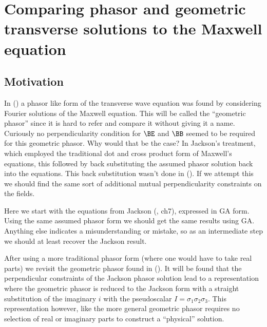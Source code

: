 

\chapter{Comparing phasor and geometric transverse solutions to the Maxwell equation}
\label{chap:transverseWave}
{}
\date{August 6, 2009}

\beginArtWithToc

\section{Motivation}

In (\cite{maxwellVacuum}) a phasor like form of the transverse wave equation was found by considering Fourier solutions of the Maxwell equation.  This will be called the ``geometric phasor'' since it is hard to refer and compare it without giving it a name.  Curiously no perpendicularity condition for $\BE$ and $\BB$ seemed to be required for this geometric phasor.  Why would that be the case?  In Jackson's treatment, which employed the traditional dot and cross product form of Maxwell's equations, this followed by back substituting the assumed phasor solution back into the equations.  This back substitution wasn't done in (\cite{maxwellVacuum}).  If we attempt this we should find the same sort of additional mutual perpendicularity constraints on the fields.

Here we start with the equations from Jackson (\cite{jackson1975cew}, ch7), expressed in GA form.  Using the same assumed phasor form we should get the same results using GA.  Anything else indicates a misunderstanding or mistake, so as an intermediate step we should at least recover the Jackson result.

After using a more traditional phasor form (where one would have to take real parts) we revisit the geometric phasor found in (\cite{maxwellVacuum}).  It will be found that the perpendicular constraints of the Jackson phasor solution lead to a representation where the geometric phasor is reduced to the Jackson form with a straight substitution of the imaginary $i$ with the pseudoscalar $I = \sigma_1\sigma_2\sigma_3$.  This representation however, like the more general geometric phasor requires no selection of real or imaginary parts to construct a ``physical'' solution.

